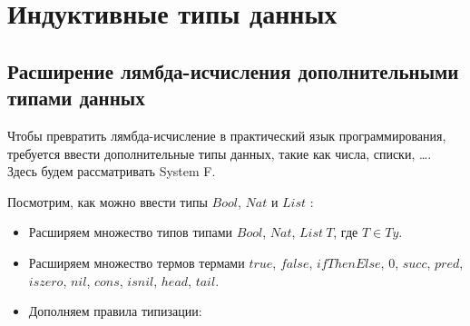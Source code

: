 \section{Индуктивные типы данных}

\subsection{Расширение лямбда-исчисления дополнительными типами данных}

Чтобы превратить лямбда-исчисление в практический язык программирования,
требуется ввести дополнительные типы данных, такие как числа, списки, \dots.
Здесь будем рассматривать System F.

Посмотрим, как можно ввести типы \(Bool\), \(Nat\) и \(List\) \cite{tapl}:
\begin{itemize}
\item Расширяем множество типов типами \(Bool\), \(Nat\), \(List\ T\), где \(T \in Ty\).
\item Расширяем множество термов термами \(true\), \(false\), \(ifThenElse\),
   \(0\), \(succ\), \(pred\), \(iszero\),
   \(nil\), \(cons\), \(isnil\), \(head\), \(tail\).
\item Дополняем правила типизации:
   \begin{prooftree}
   \end{prooftree}
   \begin{prooftree}
   \end{prooftree}
   \begin{prooftree}
   \end{prooftree}

   \begin{prooftree}
   \end{prooftree}
   \begin{prooftree}
   \end{prooftree}
   \begin{prooftree}
   \end{prooftree}
   \begin{prooftree}
   \end{prooftree}


\end{itemize}
